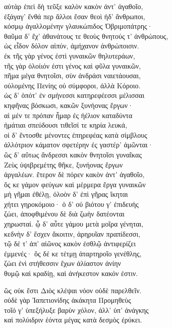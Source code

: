 \quad{}αὐτὰρ ἐπεὶ δὴ τεῦξε καλὸν κακὸν ἀντ' ἀγαθοῖο,  \\
ἐξάγαγ' ἔνθά περ ἄλλοι ἔσαν θεοὶ ἠδ' ἄνθρωποι,\\
κόσμῳ ἀγαλλομένην γλαυκώπιδος Ὀβριμοπάτρης· \\
θαῦμα δ' ἔχ' ἀθανάτους τε θεοὺς θνητούς τ' ἀνθρώπους,\\
ὡς εἶδον δόλον αἰπύν, ἀμήχανον ἀνθρώποισιν.\\
ἐκ τῆς γὰρ γένος ἐστὶ γυναικῶν θηλυτεράων, \\
τῆς γὰρ ὀλοίιόν ἐστι γένος καὶ φῦλα γυναικῶν,\\
πῆμα μέγα θνητοῖσι, σὺν ἀνδράσι ναιετάουσαι,\\
οὐλομένης Πενίης οὐ σύμφοροι, ἀλλὰ Κόροιο.\\
ὡς δ' ὁπότ' ἐν σμήνεσσι κατηρεφέεσσι μέλισσαι\\
κηφῆνας βόσκωσι, κακῶν ξυνήονας ἔργων· \\
αἱ μέν τε πρόπαν ἦμαρ ἐς ἠέλιον καταδύντα\\
ἠμάτιαι σπεύδουσι τιθεῖσί τε κηρία λευκά,\\
οἱ δ' ἔντοσθε μένοντες ἐπηρεφέας κατὰ σίμβλους \\
ἀλλότριον κάματον σφετέρην ἐς γαστέρ' ἀμῶνται· \\
ὣς δ' αὔτως ἄνδρεσσι κακὸν θνητοῖσι γυναῖκας \\
Ζεὺς ὑψιβρεμέτης θῆκε, ξυνήονας ἔργων\\
ἀργαλέων. ἕτερον δὲ πόρεν κακὸν ἀντ' ἀγαθοῖο,\\
ὅς κε γάμον φεύγων καὶ μέρμερα ἔργα γυναικῶν\\
μὴ γῆμαι ἐθέλῃ, ὀλοὸν δ' ἐπὶ γῆρας ἵκηται\\
χήτει γηροκόμοιο· ὁ δ' οὐ βιότου γ' ἐπιδευὴς  \\
ζώει, ἀποφθιμένου δὲ διὰ ζωὴν δατέονται\\
χηρωσταί. ᾧ δ' αὖτε γάμου μετὰ μοῖρα γένηται, \\
κεδνὴν δ' ἔσχεν ἄκοιτιν, ἀρηρυῖαν πραπίδεσσι, \\
τῷ δέ τ' ἀπ' αἰῶνος κακὸν ἐσθλῷ ἀντιφερίζει\\
ἐμμενές· ὃς δέ κε τέτμῃ ἀταρτηροῖο γενέθλης,  \\
ζώει ἐνὶ στήθεσσιν ἔχων ἀλίαστον ἀνίην\\
θυμῷ καὶ κραδίῃ, καὶ ἀνήκεστον κακόν ἐστιν.

\quad{}ὣς οὐκ ἔστι Διὸς κλέψαι νόον οὐδὲ παρελθεῖν.\\
οὐδὲ γὰρ Ἰαπετιονίδης ἀκάκητα Προμηθεὺς\\
τοῖό γ' ὑπεξήλυξε βαρὺν χόλον, ἀλλ' ὑπ' ἀνάγκης \\
καὶ πολύιδριν ἐόντα μέγας κατὰ δεσμὸς ἐρύκει.

